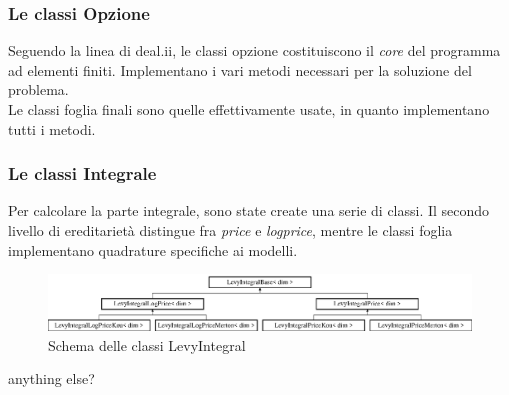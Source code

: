\documentclass{beamer}
\begin{document}

\begin{frame}[t]
 \frametitle{Le classi Opzione}

 Seguendo la linea di \textsf{deal.ii}, le classi opzione costituiscono il \emph{core} del programma ad elementi finiti. Implementano i vari metodi necessari per la soluzione del problema.\\ Le classi foglia finali sono quelle effettivamente usate, in quanto implementano tutti i metodi.
\end{frame}

\begin{frame}[t]
 \frametitle{Le classi Integrale}
 Per calcolare la parte integrale, sono state create una serie di classi. Il secondo livello di ereditarietà distingue fra \emph{price} e \emph{logprice}, mentre le classi foglia implementano quadrature specifiche ai modelli.

 \begin{figure}
  \centering
  \includegraphics[width=\linewidth]{classLevyIntegralBase}
 \caption{Schema delle classi LevyIntegral}
 \end{figure}
 \pause
 \begin{block}{anything else?}

 \end{block}
\end{frame}
\end{document}
